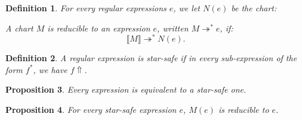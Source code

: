 \documentclass{article}
\newtheorem{definition}{Definition}[section]
\newtheorem{proposition}[definition]{Proposition}
\newtheorem{example}[definition]{Example}
\begin{document}
\begin{definition}
For every regular expressions $e$, we let ${N}(e)$ be the chart:
\begin{center}
    \end{center}
A chart $M$ is \emph{reducible} to an expression $e$, written $M\twoheadrightarrow^* e$, if:
     $$\llbracket M\rrbracket \twoheadrightarrow^* N(e).$$
\end{definition}

\begin{definition}
    A regular expression is \emph{star-safe} if in every sub-expression of the form $f^*$, we have $f\Uparrow$.
\end{definition}

\begin{proposition}
  Every expression is equivalent to a star-safe one.
    ~\label{prop:every-expression-is-equivalent-to-a-safe-one}
\end{proposition}

\begin{proposition} For every star-safe expression $e$, $M(e)$ is reducible to $e$.
    ~\label{prop:Milner-is-reducible}
\end{proposition}


\end{document}
